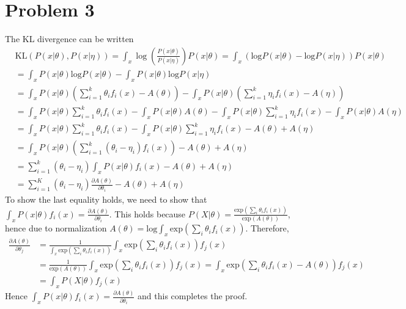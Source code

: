 \documentclass[12pt]{article}
\begin{document}
\section*{Problem 3}
\label{sec:prob3}
The KL divergence can be written 
\begin{equation}
    \begin{split}
        &\text{KL}(P(x|\theta),P(x|\eta)) = \int_x \log\left(\frac{P(x|\theta)}{P(x|\eta)}\right)P(x|\theta) 
            = \int_x \left( \text{log}P(x|\theta) - \text{log}P(x|\eta) \right) P(x|\theta) \\
        & = \int_x P(x|\theta) \text{log}P(x|\theta) - \int_x P(x|\theta) \text{log}P(x|\eta) \\
        & = \int_x P(x|\theta) \left( \sum_{i=1}^k \theta_i f_i(x) - A(\theta)  \right) -   
                \int_x P(x|\theta) \left( \sum_{i=1}^k \eta_i f_i(x) - A(\eta)  \right) \\
        & = \int_x P(x|\theta) \sum_{i=1}^k \theta_i f_i(x) - \int_x P(x|\theta) A(\theta)  -   
                \int_x P(x|\theta) \sum_{i=1}^k \eta_i f_i(x) - \int_x P(x|\theta) A(\eta) \\
        & = \int_x P(x|\theta) \sum_{i=1}^k \theta_i f_i(x) - \int_x P(x|\theta) \sum_{i=1}^k \eta_i f_i(x) 
            - A(\theta) + A(\eta)\\
        & = \int_x P(x|\theta) \left( \sum_{i=1}^k (\theta_i - \eta_i) f_i(x) \right)- A(\theta) + A(\eta)\\
        & = \sum_{i=1}^k (\theta_i - \eta_i) \int_x P(x|\theta) f_i(x) - A(\theta) + A(\eta)\\
        & = \sum_{i=1}^K (\theta_i - \eta_i) \frac{\partial A(\theta)}{\partial \theta_i} - A(\theta) + A(\eta)
    \end{split}
\end{equation}
To show the last equality holds, we need to show that $\int_x P(x|\theta) f_i(x) = \frac{\partial A(\theta)}{\partial \theta_i}$. This holds because $P(X|\theta) = \frac{\text{exp}(\sum_i \theta_i f_i(x))}{\text{exp}(A(\theta))}$, hence due to normalization $A(\theta) = \text{log}\int_x \text{exp}(\sum_i \theta_i f_i(x))$.
Therefore,
\begin{equation}
    \begin{split}
        \frac{\partial A(\theta)}{\partial \theta_j}
            &= \frac{1}{\int_x \text{exp}(\sum_i \theta_i f_i(x))}   \int_x \text{exp}(\sum_i \theta_i f_i(x)) f_j(x) \\
            &= \frac{1}{\text{exp}(A(\theta))} \int_x \text{exp}(\sum_i \theta_i f_i(x)) f_j(x) 
                = \int_x \text{exp}(\sum_i \theta_i f_i(x) - A(\theta)) f_j(x) \\
            &= \int_x P(X|\theta)f_j(x)
    \end{split}
\end{equation}
Hence $\int_x P(x|\theta) f_i(x) = \frac{\partial A(\theta)}{\partial \theta_i}$ and this completes the proof.
\end{document}
